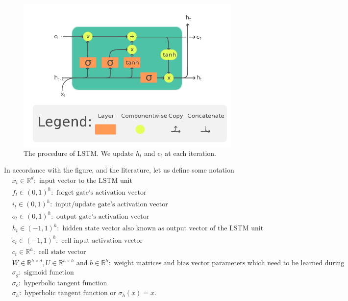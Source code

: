\documentclass[twoside]{report}
\begin{document}
\begin{spacing}{1}
\begin{figure}[!htbp]
    \centering
    \includegraphics[scale = 0.4]{Images/LSTM.png}
    \caption{The procedure of LSTM. We update $h_t$ and $c_t$ at each iteration.}
    \label{fig:LSTM}
\end{figure}

In accordance with the figure, and the literature, let us define some notation
$$
\begin{aligned}
&x_{t} \in \mathbb{R}^{d}: \text { input vector to the LSTM unit } \\
&f_{t} \in(0,1)^{h}: \text { forget gate's activation vector } \\
&i_{t} \in(0,1)^{h}: \text { input/update gate's activation vector } \\
&o_{t} \in(0,1)^{h}: \text { output gate's activation vector } \\
&h_{t} \in(-1,1)^{h}: \text { hidden state vector also known as output vector of the LSTM unit } \\
&\tilde{c}_{t} \in(-1,1)^{h}: \text { cell input activation vector } \\
&c_{t} \in \mathbb{R}^{h}: \text { cell state vector } \\
&W \in \mathbb{R}^{h \times d}, U \in \mathbb{R}^{h \times h} \text { and } b \in \mathbb{R}^{h}: \text { weight matrices and bias vector parameters which need to be learned during training }\\
&\sigma_{g} :\text{ sigmoid function}\\
&\sigma_{c} :\text{ hyperbolic tangent function}\\
&\sigma_{h} :\text{ hyperbolic tangent function or  $\sigma_{h}(x)=x$.}
\end{aligned}
$$


\end{spacing}
\end{document}
